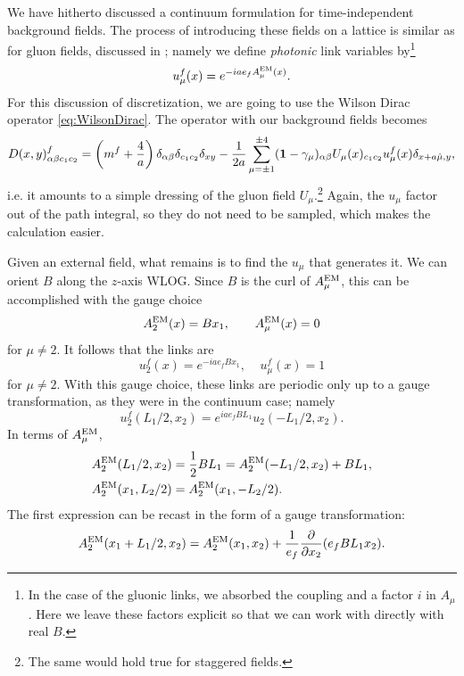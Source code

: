 We have hitherto discussed a continuum formulation for time-independent
background fields. The process of introducing these fields on a lattice is
similar as for gluon fields, discussed in ; namely we define
{\it photonic} link variables by\footnote{In the case of
the gluonic links, we absorbed the coupling and a factor $i$ in $A_\mu$. Here
we leave these factors explicit so that we can work with directly with real
$B$.}
\begin{equation}
u_\mu^f(x)=e^{-iae_fA^{\rm EM}_\mu(x)}.
\end{equation}
For this discussion of discretization, we are going to use the Wilson
Dirac operator \eqref{eq:WilsonDirac}. The operator with our background fields
becomes
\begin{equation}\label{eq:WilsonDirac}
  D(x,y)^f_{\alpha\beta c_1c_2}
  =\left(m^f+\frac{4}{a}\right)\delta_{\alpha\beta}
                               \delta_{c_1c_2}
                               \delta_{xy}
   -\frac{1}{2a}\sum_{\mu=\pm 1}^{\pm 4}({\mathbf 1}-\gamma_\mu)_{\alpha\beta}
      U_\mu(x)_{c_1 c_2}u_\mu^f(x)\delta_{x+a\hat{\mu},y},
\end{equation}
i.e. it amounts to a simple dressing of the gluon field $U_\mu$.\footnote{The
same would hold true for staggered fields.} Again, the
$u_\mu$ factor out of the path integral, so they do not need to be sampled,
which makes the calculation easier.

Given an external field, what remains is to find the $u_\mu$ that generates it.
We can orient $B$ along the $z$-axis WLOG. Since $B$ is the curl of $A^{\rm EM}_\mu$,
this can be accomplished with the gauge choice
\begin{equation}
A^{\rm EM}_2(x)=Bx_1,~~~~~~A^{\rm EM}_\mu(x)=0
\end{equation}
for $\mu\neq 2$. It follows that the links are
\begin{equation}
u^f_2(x)=e^{-iae_fBx_1},~~~~~u^f_\mu(x)=1
\end{equation}
for $\mu\neq 2$. With this gauge choice, these links are periodic only up to a
gauge transformation, as they were in the continuum case; namely
\begin{equation}\label{eq:utwisted}
u^f_2(L_1/2,x_2)=e^{iae_fBL_1}u_2(-L_1/2,x_2).
\end{equation}
In terms of $A^{\rm EM}_\mu$,
\begin{equation}\begin{aligned}
A^{\rm EM}_2(L_1 / 2, x_2)&=\frac{1}{2} B L_1=A^{\rm EM}_2(-L_1 / 2, x_2)+B L_1, \\
A^{\rm EM}_2(x_1, L_2 / 2)&=A^{\rm EM}_2(x_1,-L_2 / 2) .
\end{aligned}\end{equation}
The first expression can be recast in the form of a gauge transformation:
\begin{equation}
A^{\rm EM}_2(x_1+L_1 / 2, x_2)=A^{\rm EM}_2(x_1, x_2)+\frac{1}{e_f} \frac{\partial}{\partial
x_2}(e_f B L_1 x_2).
\end{equation}

